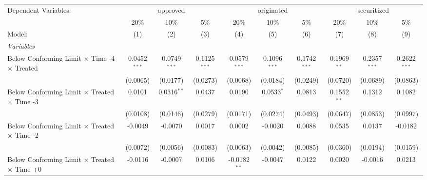 \begingroup
\centering
\begin{tabular}{lccccccccc}
   \tabularnewline \midrule \midrule
   Dependent Variables: & \multicolumn{3}{c}{approved} & \multicolumn{3}{c}{originated} & \multicolumn{3}{c}{securitized}\\
                                                              & 20\%           & 10\%           & 5\%            & 20\%           & 10\%           & 5\%            & 20\%           & 10\%           & 5\% \\    
   Model:                                                     & (1)            & (2)            & (3)            & (4)            & (5)            & (6)            & (7)            & (8)            & (9)\\  
   \midrule
   \emph{Variables}\\
   Below Conforming Limit $\times$ Time -4 $\times$ Treated   & 0.0452$^{***}$ & 0.0749$^{***}$ & 0.1125$^{***}$ & 0.0579$^{***}$ & 0.1096$^{***}$ & 0.1742$^{***}$ & 0.1969$^{**}$  & 0.2357$^{***}$ & 0.2622$^{***}$\\   
                                                              & (0.0065)       & (0.0177)       & (0.0273)       & (0.0068)       & (0.0184)       & (0.0249)       & (0.0720)       & (0.0689)       & (0.0863)\\   
   Below Conforming Limit $\times$ Treated $\times$ Time -3   & 0.0101         & 0.0316$^{**}$  & 0.0437         & 0.0190         & 0.0533$^{*}$   & 0.0813         & 0.1552$^{**}$  & 0.1312         & 0.1082\\   
                                                              & (0.0108)       & (0.0146)       & (0.0279)       & (0.0171)       & (0.0274)       & (0.0493)       & (0.0647)       & (0.0853)       & (0.0997)\\   
   Below Conforming Limit $\times$ Treated $\times$ Time -2   & -0.0049        & -0.0070        & 0.0017         & 0.0002         & -0.0020        & 0.0088         & 0.0535         & 0.0137         & -0.0182\\   
                                                              & (0.0072)       & (0.0056)       & (0.0083)       & (0.0063)       & (0.0042)       & (0.0085)       & (0.0360)       & (0.0194)       & (0.0159)\\   
   Below Conforming Limit $\times$ Treated $\times$ Time +0   & -0.0116        & -0.0007        & 0.0106         & -0.0182$^{**}$ & -0.0047        & 0.0122         & 0.0020         & -0.0016        & 0.0213\\   

\end{tabular}
